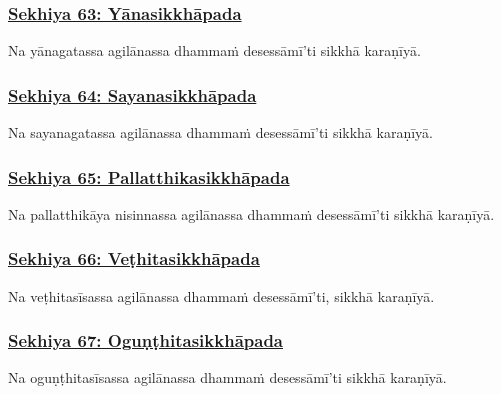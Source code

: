 \subsubsection*{\hyperref[training63]{Sekhiya 63: Yānasikkhāpada}}
\label{sekh63}

Na yānagatassa agilānassa dhammaṁ desessāmī'ti sikkhā karaṇīyā.



\subsubsection*{\hyperref[training64]{Sekhiya 64: Sayanasikkhāpada}}
\label{sekh64}

Na sayanagatassa agilānassa dhammaṁ desessāmī'ti sikkhā karaṇīyā.



\subsubsection*{\hyperref[training65]{Sekhiya 65: Pallatthikasikkhāpada}}
\label{sekh65}

Na pallatthikāya nisinnassa agilānassa dhammaṁ desessāmī'ti sikkhā karaṇīyā.



\subsubsection*{\hyperref[training66]{Sekhiya 66: Veṭhitasikkhāpada}}
\label{sekh66}

Na veṭhitasīsassa\makeatletter\hyperlink{endnote517-appendix}\makeatother{} agilānassa dhammaṁ desessāmī'ti, sikkhā karaṇīyā.



\subsubsection*{\hyperref[training67]{Sekhiya 67: Oguṇṭhitasikkhāpada}}
\label{sekh67}

Na oguṇṭhitasīsassa agilānassa dhammaṁ desessāmī'ti sikkhā karaṇīyā.



